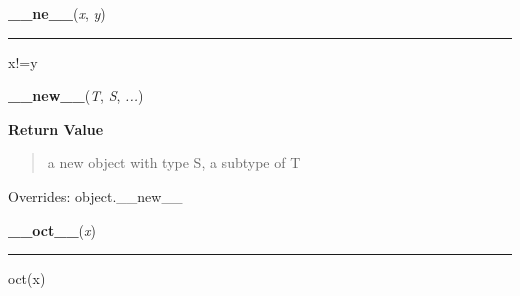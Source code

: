 \hspace{.8\funcindent}\begin{boxedminipage}{\funcwidth}

    \raggedright \textbf{\_\_ne\_\_}(\textit{x}, \textit{y})

    \vspace{-1.5ex}

    \rule{\textwidth}{0.5\fboxrule}
\setlength{\parskip}{2ex}
    x!=y

\setlength{\parskip}{1ex}
    \end{boxedminipage}

    \vspace{0.5ex}

\hspace{.8\funcindent}\begin{boxedminipage}{\funcwidth}

    \raggedright \textbf{\_\_new\_\_}(\textit{T}, \textit{S}, \textit{...})

\setlength{\parskip}{2ex}
\setlength{\parskip}{1ex}
      \textbf{Return Value}
    \vspace{-1ex}

      \begin{quote}
      a new object with type S, a subtype of T

      \end{quote}

      Overrides: object.\_\_new\_\_

    \end{boxedminipage}

    \label{pygame:Color:__oct__}

    \vspace{0.5ex}

\hspace{.8\funcindent}\begin{boxedminipage}{\funcwidth}

    \raggedright \textbf{\_\_oct\_\_}(\textit{x})

    \vspace{-1.5ex}

    \rule{\textwidth}{0.5\fboxrule}
\setlength{\parskip}{2ex}
    oct(x)

\setlength{\parskip}{1ex}
    \end{boxedminipage}

    \label{pygame:Color:__radd__}

